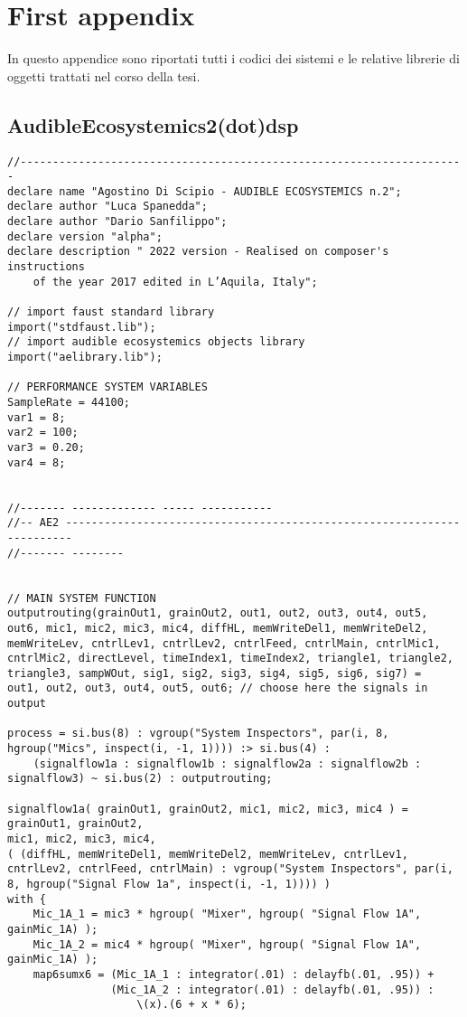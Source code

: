 \section{First appendix}

In questo appendice sono riportati tutti i codici dei sistemi
e le relative librerie di oggetti trattati
nel corso della tesi.

\subsection{AudibleEcosystemics2(dot)dsp}

\vspace{0.5cm}
\begin{lstlisting}
//---------------------------------------------------------------------
declare name "Agostino Di Scipio - AUDIBLE ECOSYSTEMICS n.2";
declare author "Luca Spanedda";
declare author "Dario Sanfilippo";
declare version "alpha";
declare description " 2022 version - Realised on composer's instructions
    of the year 2017 edited in L’Aquila, Italy";

// import faust standard library
import("stdfaust.lib");
// import audible ecosystemics objects library
import("aelibrary.lib");

// PERFORMANCE SYSTEM VARIABLES
SampleRate = 44100;
var1 = 8;
var2 = 100;
var3 = 0.20;
var4 = 8;


//------- ------------- ----- -----------
//-- AE2 -----------------------------------------------------------------------
//------- --------


// MAIN SYSTEM FUNCTION
outputrouting(grainOut1, grainOut2, out1, out2, out3, out4, out5, out6, mic1, mic2, mic3, mic4, diffHL, memWriteDel1, memWriteDel2, memWriteLev, cntrlLev1, cntrlLev2, cntrlFeed, cntrlMain, cntrlMic1, cntrlMic2, directLevel, timeIndex1, timeIndex2, triangle1, triangle2, triangle3, sampWOut, sig1, sig2, sig3, sig4, sig5, sig6, sig7) =
out1, out2, out3, out4, out5, out6; // choose here the signals in output

process = si.bus(8) : vgroup("System Inspectors", par(i, 8, hgroup("Mics", inspect(i, -1, 1)))) :> si.bus(4) : 
    (signalflow1a : signalflow1b : signalflow2a : signalflow2b : signalflow3) ~ si.bus(2) : outputrouting;

signalflow1a( grainOut1, grainOut2, mic1, mic2, mic3, mic4 ) = 
grainOut1, grainOut2, 
mic1, mic2, mic3, mic4, 
( (diffHL, memWriteDel1, memWriteDel2, memWriteLev, cntrlLev1, cntrlLev2, cntrlFeed, cntrlMain) : vgroup("System Inspectors", par(i, 8, hgroup("Signal Flow 1a", inspect(i, -1, 1)))) )
with {
    Mic_1A_1 = mic3 * hgroup( "Mixer", hgroup( "Signal Flow 1A", gainMic_1A) );
    Mic_1A_2 = mic4 * hgroup( "Mixer", hgroup( "Signal Flow 1A", gainMic_1A) );
    map6sumx6 = (Mic_1A_1 : integrator(.01) : delayfb(.01, .95)) +
                (Mic_1A_2 : integrator(.01) : delayfb(.01, .95)) : 
                    \(x).(6 + x * 6);


\end{lstlisting}
